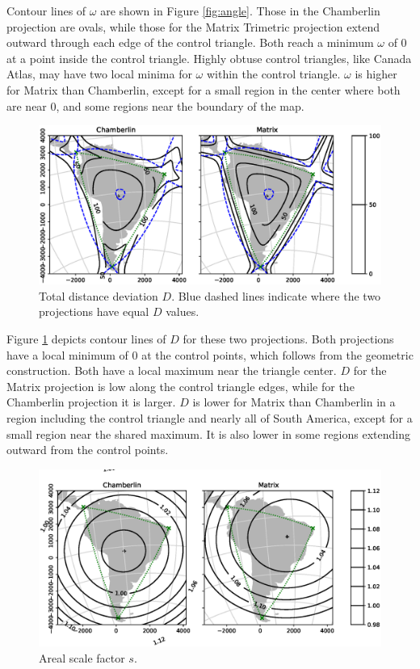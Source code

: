 \documentclass[]{interact}
\begin{document}
Contour lines of $\omega$ are shown in Figure \ref{fig:angle}. Those in the
Chamberlin projection are ovals, while those for the Matrix Trimetric
projection extend outward through each edge of the control triangle. Both
reach a minimum $\omega$ of 0 at a point inside the control triangle. Highly
obtuse control triangles, like Canada Atlas, may have two local minima for
$\omega$ within the control triangle. $\omega$ is higher for Matrix than
Chamberlin, except for a small region in the center where both are near 0,
and some regions near the boundary of the map.

\begin{figure}%
  \includegraphics[width=\textwidth]{SA_Wall_Map_distance}
  \caption{Total distance deviation $D$. Blue dashed lines
  indicate where the two projections have equal $D$ values.}
  \label{fig:distance}
\end{figure}

Figure \ref{fig:distance} depicts contour lines of $D$ for these two
projections. Both projections have a local minimum of 0 at the control points,
which follows from the geometric construction. Both have a local maximum near
the triangle center. $D$ for the Matrix projection is low along the control
triangle edges, while for the Chamberlin projection it is larger. $D$ is
lower for Matrix than Chamberlin in a region including the control triangle and
nearly all of South America, except for a small region near the shared maximum.
It is also lower in some regions extending outward from the control points.

\begin{figure}%
  \includegraphics[width=\textwidth]{SA_Wall_Map_scale}
  \caption{Areal scale factor $s$.}
  \label{fig:scale}
\end{figure}
\end{document}
